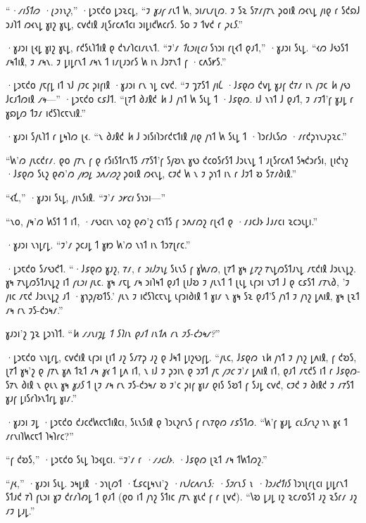 “\emph{·𐑥𐑦𐑕𐑑𐑼 ·𐑚𐑮𐑪𐑯𐑟},” ·𐑛𐑮𐑱𐑒𐑴 𐑛𐑮𐑷𐑤𐑛, “𐑲 \emph{𐑣𐑨𐑝} 𐑥𐑧𐑑 𐑿, 𐑮𐑦𐑥𐑧𐑥𐑚𐑼. 𐑲 𐑕𐑷 𐑕𐑳𐑥𐑢𐑳𐑯 𐑜𐑴𐑦𐑙 𐑼𐑬𐑯𐑛 𐑢𐑦𐑞 𐑩 𐑕𐑒𐑸𐑓 𐑮𐑨𐑐𐑑 𐑼𐑬𐑯𐑛 𐑣𐑦𐑟 𐑣𐑧𐑛, 𐑤𐑫𐑒𐑦𐑙 𐑨𐑚𐑕𐑩𐑤𐑵𐑑𐑤𐑦 𐑮𐑦𐑛𐑦𐑒𐑿𐑤𐑩𐑕. 𐑕𐑴 𐑲 𐑑𐑫𐑒 𐑩 \emph{𐑜𐑧𐑕}.”

·𐑣𐑨𐑮𐑦 𐑚𐑬𐑛 𐑣𐑦𐑟 𐑣𐑧𐑛, 𐑩𐑒𐑕𐑧𐑐𐑑𐑦𐑙 𐑞 𐑒𐑪𐑥𐑐𐑤𐑦𐑥𐑧𐑯𐑑. “𐑲'𐑥 \emph{𐑑𐑧𐑮𐑦𐑚𐑤𐑦} 𐑕𐑪𐑮𐑦 𐑩𐑚𐑬𐑑 𐑞𐑨𐑑,” ·𐑣𐑨𐑮𐑦 𐑕𐑧𐑛. “𐑬𐑼 𐑓𐑻𐑕𐑑 𐑥𐑰𐑑𐑦𐑙, 𐑲 𐑥𐑰𐑯. 𐑲 𐑛𐑦𐑛𐑩𐑯𐑑 𐑥𐑰𐑯 𐑑 𐑦𐑥𐑚𐑨𐑮𐑩𐑕 𐑿 𐑦𐑯 𐑓𐑮𐑳𐑯𐑑 𐑝 ·𐑤𐑵𐑕𐑾𐑕.”

·𐑛𐑮𐑱𐑒𐑴 𐑢𐑱𐑝𐑛 𐑦𐑑 𐑪𐑓 𐑢𐑲𐑤 𐑜𐑦𐑝𐑦𐑙 ·𐑣𐑨𐑮𐑦 𐑩𐑯 𐑪𐑛 𐑤𐑫𐑒. “𐑲 𐑡𐑳𐑕𐑑 𐑢𐑦𐑖 ·𐑓𐑭𐑞𐑼 𐑒𐑫𐑛 𐑣𐑨𐑝 𐑒𐑳𐑥 𐑦𐑯 𐑢𐑲𐑤 \emph{𐑿} 𐑢𐑻 𐑓𐑤𐑨𐑑𐑼𐑦𐑙 \emph{𐑥𐑰}—” ·𐑛𐑮𐑱𐑒𐑴 𐑤𐑭𐑓𐑑. “𐑚𐑳𐑑 𐑔𐑨𐑙𐑒 \emph{𐑿} 𐑓 𐑢𐑪𐑑 𐑿 𐑕𐑧𐑛 𐑑 ·𐑓𐑭𐑞𐑼. 𐑦𐑓 𐑯𐑪𐑑 𐑓 𐑞𐑨𐑑, 𐑲 𐑥𐑲𐑑'𐑝 𐑣𐑨𐑛 𐑩 𐑣𐑸𐑛𐑼 𐑑𐑲𐑥 𐑦𐑒𐑕𐑐𐑤𐑱𐑯𐑦𐑙.”

·𐑣𐑨𐑮𐑦 𐑕𐑢𐑧𐑐𐑑 𐑩 𐑛𐑰𐑐𐑼 𐑚𐑬. “𐑯 𐑔𐑨𐑙𐑒 \emph{𐑿} 𐑓 𐑮𐑦𐑕𐑦𐑐𐑮𐑩𐑒𐑱𐑑𐑦𐑙 𐑢𐑦𐑞 𐑢𐑪𐑑 𐑿 𐑕𐑧𐑛 𐑑 ·𐑐𐑮𐑩𐑓𐑧𐑕𐑼 ·𐑥𐑩𐑒𐑜𐑪𐑯𐑨𐑜𐑷𐑤.”

“𐑿'𐑼 𐑢𐑧𐑤𐑒𐑩𐑥. 𐑞𐑴 𐑢𐑳𐑯 𐑝 𐑞 𐑩𐑕𐑦𐑕𐑑𐑩𐑯𐑑𐑕 𐑥𐑳𐑕𐑑'𐑝 𐑕𐑢𐑹𐑯 𐑣𐑻 𐑒𐑤𐑴𐑕𐑩𐑕𐑑 𐑓𐑮𐑧𐑯𐑛 𐑑 𐑨𐑚𐑕𐑩𐑤𐑵𐑑 𐑕𐑰𐑒𐑮𐑩𐑕𐑦, 𐑚𐑦𐑒𐑪𐑟 ·𐑓𐑭𐑞𐑼 𐑕𐑧𐑟 𐑞𐑺'𐑼 \emph{𐑢𐑽𐑛 𐑮𐑵𐑥𐑼𐑟} 𐑜𐑴𐑦𐑙 𐑼𐑬𐑯𐑛, 𐑤𐑲𐑒 𐑿 𐑯 𐑲 𐑜𐑪𐑑 𐑦𐑯 𐑩 𐑓𐑲𐑑 𐑹 𐑕𐑳𐑥𐑔𐑦𐑙.”

“𐑬𐑗,” ·𐑣𐑨𐑮𐑦 𐑕𐑧𐑛, 𐑢𐑦𐑯𐑕𐑦𐑙. “𐑲'𐑥 \emph{𐑮𐑾𐑤𐑦} 𐑕𐑪𐑮𐑦—”

“𐑯𐑴, 𐑢𐑰'𐑼 𐑿𐑕𐑑 𐑑 𐑦𐑑, ·𐑥𐑻𐑤𐑦𐑯 𐑯𐑴𐑟 𐑞𐑺'𐑟 𐑤𐑪𐑑𐑕 𐑝 𐑮𐑵𐑥𐑼𐑟 𐑩𐑚𐑬𐑑 𐑞 ·𐑥𐑨𐑤𐑓𐑶 𐑓𐑨𐑥𐑤𐑦 𐑷𐑤𐑮𐑧𐑛𐑦.”

·𐑣𐑨𐑮𐑦 𐑯𐑪𐑛𐑩𐑛. “𐑲'𐑥 𐑜𐑤𐑨𐑛 𐑑 𐑣𐑽 𐑿'𐑼 𐑯𐑪𐑑 𐑦𐑯 𐑑𐑮𐑳𐑚𐑩𐑤.”

·𐑛𐑮𐑱𐑒𐑴 𐑕𐑥𐑻𐑒𐑑. “·𐑓𐑭𐑞𐑼 𐑣𐑨𐑟, 𐑳𐑥, 𐑩 \emph{𐑮𐑦𐑓𐑲𐑯𐑛} 𐑕𐑧𐑯𐑕 𐑝 𐑣𐑿𐑥𐑼, 𐑚𐑳𐑑 𐑣𐑰 \emph{𐑛𐑳𐑟} 𐑳𐑯𐑛𐑼𐑕𐑑𐑨𐑯𐑛 𐑥𐑱𐑒𐑦𐑙 𐑓𐑮𐑧𐑯𐑛𐑟. 𐑣𐑰 𐑳𐑯𐑛𐑼𐑕𐑑𐑨𐑯𐑛𐑟 𐑦𐑑 \emph{𐑝𐑧𐑮𐑦} 𐑢𐑧𐑤. 𐑣𐑰 𐑥𐑱𐑛 𐑥𐑰 𐑮𐑦𐑐𐑰𐑑 𐑞𐑨𐑑 𐑚𐑦𐑓𐑹 𐑲 𐑢𐑧𐑯𐑑 𐑑 𐑚𐑧𐑛 𐑧𐑝𐑮𐑦 𐑯𐑲𐑑 𐑓 𐑞 𐑤𐑭𐑕𐑑 𐑥𐑳𐑯𐑔, '𐑲 𐑢𐑦𐑤 𐑥𐑱𐑒 𐑓𐑮𐑧𐑯𐑛𐑟 𐑨𐑑 ·𐑣𐑪𐑜𐑢𐑹𐑑𐑕.' 𐑢𐑧𐑯 𐑲 𐑦𐑒𐑕𐑐𐑤𐑱𐑯𐑛 𐑧𐑝𐑮𐑦𐑔𐑦𐑙 𐑑 𐑣𐑦𐑥 𐑯 𐑣𐑰 𐑕𐑷 𐑞𐑨𐑑'𐑕 𐑢𐑪𐑑 𐑲 𐑢𐑪𐑟 𐑛𐑵𐑦𐑙, 𐑣𐑰 𐑚𐑷𐑑 𐑥𐑰 𐑩𐑯 𐑲𐑕-𐑒𐑮𐑰𐑥.”

𐑣𐑨𐑮𐑦'𐑟 𐑡𐑷 𐑛𐑮𐑪𐑐𐑑. “\emph{𐑿 𐑥𐑨𐑯𐑦𐑡𐑛 𐑑 𐑕𐑐𐑦𐑯 𐑞𐑨𐑑 𐑦𐑯𐑑𐑵 𐑩𐑯 𐑲𐑕-𐑒𐑮𐑰𐑥?}”

·𐑛𐑮𐑱𐑒𐑴 𐑯𐑪𐑛𐑩𐑛, 𐑤𐑫𐑒𐑦𐑙 𐑧𐑝𐑮𐑦 𐑚𐑦𐑑 𐑨𐑟 𐑕𐑥𐑳𐑜 𐑨𐑟 𐑞 𐑓𐑰𐑑 𐑛𐑦𐑟𐑻𐑝𐑛. “𐑢𐑧𐑤, 𐑓𐑭𐑞𐑼 \emph{𐑯𐑿} 𐑢𐑪𐑑 𐑲 𐑢𐑪𐑟 𐑛𐑵𐑦𐑙, 𐑝 𐑒𐑹𐑕, 𐑚𐑳𐑑 𐑣𐑰'𐑟 𐑞 𐑢𐑳𐑯 𐑣𐑵 𐑑𐑷𐑑 𐑥𐑰 \emph{𐑣𐑬} 𐑑 𐑛𐑵 𐑦𐑑, 𐑯 𐑦𐑓 𐑲 𐑜𐑮𐑦𐑯 𐑞 𐑮𐑲𐑑 𐑢𐑱 \emph{𐑢𐑲𐑤} 𐑲'𐑥 𐑛𐑵𐑦𐑙 𐑦𐑑, 𐑞𐑨𐑑 𐑥𐑱𐑒𐑕 𐑦𐑑 𐑩 𐑓𐑭𐑞𐑼-𐑕𐑳𐑯 𐑔𐑦𐑙 𐑯 𐑞𐑧𐑯 𐑣𐑰 \emph{𐑣𐑨𐑕} 𐑑 𐑚𐑲 𐑥𐑰 𐑩𐑯 𐑲𐑕-𐑒𐑮𐑰𐑥 𐑹 𐑲'𐑤 𐑜𐑦𐑝 𐑣𐑦𐑥 𐑞𐑦𐑕 𐑕𐑹𐑑 𐑝 𐑕𐑨𐑛 𐑤𐑫𐑒, 𐑤𐑲𐑒 𐑲 𐑔𐑦𐑙𐑒 𐑲 𐑥𐑳𐑕𐑑 𐑣𐑨𐑝 𐑛𐑦𐑕𐑩𐑐𐑶𐑯𐑑𐑩𐑛 𐑣𐑦𐑥.”

·𐑣𐑨𐑮𐑦 𐑲𐑛 ·𐑛𐑮𐑱𐑒𐑴 𐑒𐑨𐑤𐑒𐑿𐑤𐑱𐑑𐑦𐑙𐑤𐑦, 𐑕𐑧𐑯𐑕𐑦𐑙 𐑞 𐑐𐑮𐑧𐑟𐑩𐑯𐑕 𐑝 𐑩𐑯𐑳𐑞𐑼 𐑥𐑭𐑕𐑑𐑼. “𐑿'𐑝 𐑣𐑨𐑛 \emph{𐑤𐑧𐑕𐑩𐑯𐑟} 𐑪𐑯 𐑣𐑬 𐑑 𐑥𐑩𐑯𐑦𐑐𐑿𐑤𐑱𐑑 𐑐𐑰𐑐𐑩𐑤?”

“𐑝 𐑒𐑹𐑕,” ·𐑛𐑮𐑱𐑒𐑴 𐑕𐑧𐑛 𐑐𐑮𐑬𐑛𐑤𐑦. “𐑲'𐑥 𐑩 \emph{·𐑥𐑨𐑤𐑓𐑶.} ·𐑓𐑭𐑞𐑼 𐑚𐑷𐑑 𐑥𐑰 𐑑𐑿𐑑𐑼𐑟.”

“𐑢𐑬,” ·𐑣𐑨𐑮𐑦 𐑕𐑧𐑛. 𐑮𐑰𐑛𐑦𐑙 ·𐑮𐑪𐑚𐑼𐑑 ·𐑗𐑭𐑤𐑛𐑰𐑯𐑦'𐑟 \emph{·𐑦𐑯𐑓𐑤𐑵𐑩𐑯𐑕: ·𐑕𐑲𐑩𐑯𐑕 𐑯 ·𐑐𐑮𐑨𐑒𐑑𐑦𐑕} 𐑐𐑮𐑪𐑚𐑩𐑚𐑤𐑦 𐑛𐑦𐑛𐑩𐑯𐑑 𐑕𐑑𐑨𐑒 𐑳𐑐 𐑝𐑧𐑮𐑦 𐑣𐑲 𐑒𐑩𐑥𐑐𐑺𐑛 𐑑 𐑞𐑨𐑑 (𐑞𐑴 𐑦𐑑 𐑢𐑪𐑟 𐑕𐑑𐑦𐑤 𐑢𐑳𐑯 𐑣𐑧𐑒 𐑝 𐑩 𐑚𐑫𐑒). “𐑘𐑹 𐑛𐑨𐑛 𐑦𐑟 𐑷𐑤𐑥𐑴𐑕𐑑 𐑨𐑟 𐑷𐑕𐑩𐑥 𐑨𐑟 𐑥𐑲 𐑛𐑨𐑛.”

